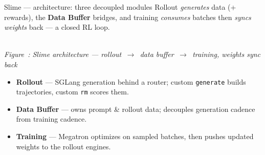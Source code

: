 \documentclass[aspectratio=169]{beamer}
\newcounter{deckfig}
\newcommand{\figtag}[1]{\refstepcounter{deckfig}%
  {\scriptsize\itshape Figure~\thedeckfig: #1}}
\begin{document}
\begin{frame}{Slime --- architecture: three decoupled modules}
  \footnotesize Rollout \emph{generates} data (+ rewards), the \textbf{Data Buffer} bridges,
  and training \emph{consumes} batches then \emph{syncs weights} back --- a closed RL loop.
  \begin{center}
  \\[0.15em]\figtag{Slime architecture --- rollout \,$\to$\, data buffer \,$\to$\, training, weights sync back}
  \end{center}
  \vspace{-0.1em}
  \footnotesize
  \begin{itemize}\setlength\itemsep{0.1em}
    \item \textbf{Rollout} --- SGLang generation behind a router; custom \texttt{generate} builds trajectories, custom \texttt{rm} scores them.
    \item \textbf{Data Buffer} --- owns prompt \& rollout data; decouples generation cadence from training cadence.
    \item \textbf{Training} --- Megatron optimizes on sampled batches, then pushes updated weights to the rollout engines.
  \end{itemize}
\end{frame}
\end{document}
